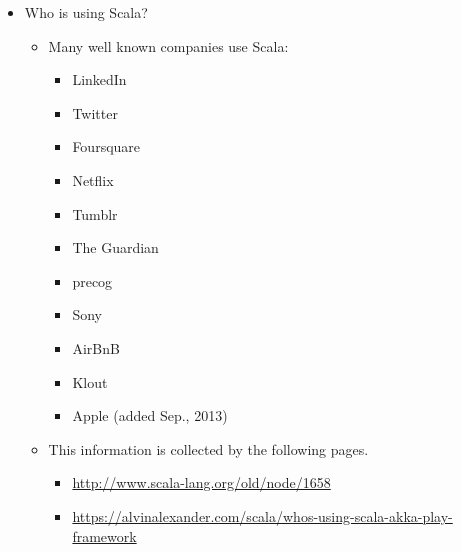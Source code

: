 \documentclass[11pt]{article}
\begin{document}
\begin{itemize}
\item Who is using Scala?
\begin{itemize}
\item Many well known companies use Scala:
\begin{itemize}
\item LinkedIn
\item Twitter
\item Foursquare
\item Netflix
\item Tumblr
\item The Guardian
\item precog
\item Sony
\item AirBnB
\item Klout
\item Apple (added Sep., 2013)
\end{itemize}
\item This information is collected by the following pages.
\begin{itemize}
\item \url{http://www.scala-lang.org/old/node/1658}
\item \url{https://alvinalexander.com/scala/whos-using-scala-akka-play-framework}
\end{itemize}
\end{itemize}
\end{itemize}
\end{document}
